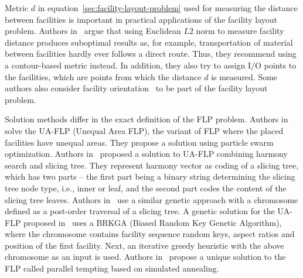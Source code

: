 Metric $d$ in equation~\ref{sec:facility-layout-problem} used for measuring the distance between facilities is important in practical applications of the facility layout problem.
Authors in~\cite{friedrichIntegratedSlicingTree2018} argue that using Euclidean $L2$ norm
to measure facility distance produces suboptimal results as, for example, transportation of material between facilities
hardly ever follows a direct route.
Thus, they recommend using a contour-based metric instead.
In addition, they also try to assign I/O points to the facilities, which are points from which the distance $d$ is measured.
Some authors also consider facility orientation~\cite{liuMultiobjectiveParticleSwarm2018, tamHierarchicalApproachFacility1991}
to be part of the facility layout problem.

Solution methods differ in the exact definition of the FLP problem.
Authors in~\cite{liuMultiobjectiveParticleSwarm2018} solve the UA-FLP (Unequal Area FLP), the variant of FLP where the placed facilities have unequal areas.
They propose a solution using particle swarm optimization.
Authors in~\cite{changSlicingTreeRepresentation2013} proposed a solution to UA-FLP combining harmony search and slicing tree.
They represent harmony vector as coding of a slicing tree, which has two parts – the first part being a binary string determining the slicing tree node type, i.e., inner or leaf, and the second part codes the content of the slicing tree leaves.
Authors in~\cite{karyantamGeneticAlgorithmsFunction1992} use a similar genetic approach with a chromosome defined as a post-order traversal of a slicing tree.
A genetic solution for the UA-FLP proposed in~\cite{goncalvesBiasedRandomkeyGenetic2015} uses a BRKGA (Biased Random Key Genetic Algorithm), where the chromosome contains facility sequence random keys,
aspect ratios and position of the first facility.
Next, an iterative greedy heuristic with the above chromosome as an input is used.
Authors in~\cite{friedrichIntegratedSlicingTree2018} propose a unique solution to the FLP called parallel tempting based on simulated annealing.
